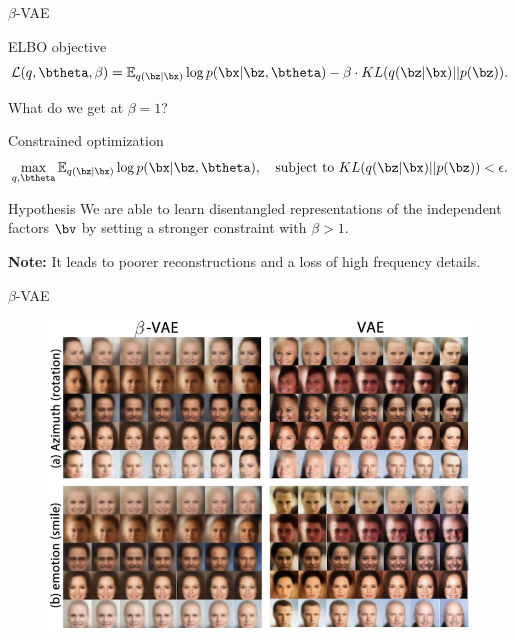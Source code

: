 \begin{frame}{$\beta$-VAE}
	\begin{block}{ELBO objective}
	\vspace{-0.2cm}
	\[
	    \mathcal{L}(q, \btheta, \beta) = \mathbb{E}_{q(\bz | \bx)} \log p(\bx | \bz, \btheta) - \beta \cdot KL (q(\bz | \bx) || p(\bz)).
	\]
	\vspace{-0.5cm}
	\end{block}
	What do we get at $\beta = 1$? \\
	\begin{block}{Constrained optimization}
		\vspace{-0.5cm}
		\[
			\max_{q, \btheta} \mathbb{E}_{q(\bz | \bx)} \log p(\bx | \bz, \btheta), \quad \text{subject to } KL (q(\bz | \bx) || p(\bz)) < \epsilon.
		\]
		\vspace{-0.5cm}
	\end{block}
	\begin{block}{Hypothesis}
	We are able to learn disentangled representations of the independent factors $\bv$ by setting a stronger constraint with $\beta > 1$.
	\end{block}
	\textbf{Note:} It leads to poorer reconstructions and a loss of high frequency details. 
\end{frame}
\begin{frame}{$\beta$-VAE}
	\begin{figure}
	    \centering
	    \includegraphics[width=0.95\linewidth]{figs/betaVAE_1.png}
	\end{figure}

\end{frame}
